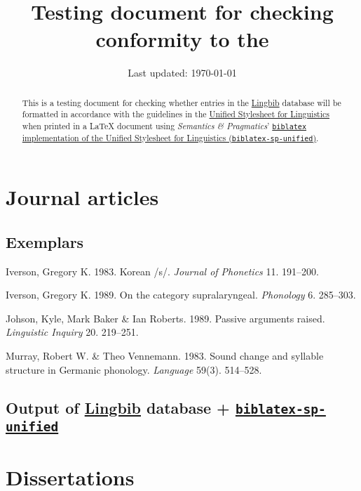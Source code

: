 \documentclass{article}
\title{Testing document for checking conformity to the \UnifiedStyleSheet}
\author{\Lingbib}
\date{Last updated: \today}
\newcommand*{\Lingbib}{\href{http://lingbib.org/}{Lingbib}}
\newcommand*{\SP}{\emph{Semantics \& Pragmatics}}
\newcommand*{\UnifiedStyleSheet}{\href{http://celxj.org/downloads/UnifiedStyleSheet.pdf}{Unified Stylesheet for Linguistics}}
\newcommand*{\SPUnified}{\href{https://github.com/semprag/biblatex-sp-unified/}{\Package{biblatex-sp-unified}}}
\newcommand*{\Package}[1]{\texttt{#1}}
\begin{document}
\maketitle

\begin{abstract}
This is a testing document for checking whether entries in the \Lingbib{} database will be formatted in accordance with the guidelines in the \UnifiedStyleSheet{} when printed in a \LaTeX{} document using  \SP' \href{https://github.com/semprag/biblatex-sp-unified/}{\Package{biblatex} implementation of the Unified Stylesheet for Linguistics (\Package{biblatex-sp-unified})}.
\end{abstract}



\section{Journal articles}

\subsection{Exemplars}

\begin{hangparas}{15pt}{1}

Iverson, Gregory K. 1983. Korean /s/. \textit{Journal of Phonetics} 11. 191--200.

Iverson, Gregory K. 1989. On the category supralaryngeal. \textit{Phonology} 6. 285--303.

Johson, Kyle, Mark Baker \& Ian Roberts. 1989. Passive arguments raised. \textit{Linguistic Inquiry} 20. 219--251.

Murray, Robert W. \& Theo Vennemann. 1983. Sound change and syllable structure in Germanic phonology. \textit{Language} 59(3). 514--528.

\end{hangparas}

\subsection{Output of \Lingbib{} database + \SPUnified}

\nocite{chomsky2013:projection}

\printbibliography[
	heading=none
]



\section{Dissertations}
\end{document}
